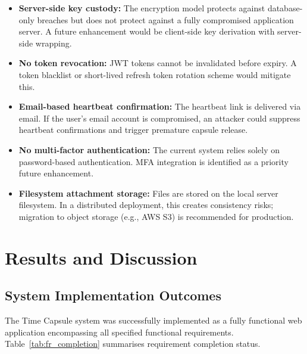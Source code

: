 \documentclass[12pt, a4paper]{article}
\begin{document}
\begin{itemize}
  \item \textbf{Server-side key custody:} The encryption model protects against database-only breaches but does not protect against a fully compromised application server. A future enhancement would be client-side key derivation with server-side wrapping.
  \item \textbf{No token revocation:} JWT tokens cannot be invalidated before expiry. A token blacklist or short-lived refresh token rotation scheme would mitigate this.
  \item \textbf{Email-based heartbeat confirmation:} The heartbeat link is delivered via email. If the user's email account is compromised, an attacker could suppress heartbeat confirmations and trigger premature capsule release.
  \item \textbf{No multi-factor authentication:} The current system relies solely on password-based authentication. MFA integration is identified as a priority future enhancement.
  \item \textbf{Filesystem attachment storage:} Files are stored on the local server filesystem. In a distributed deployment, this creates consistency risks; migration to object storage (e.g., AWS S3) is recommended for production.
\end{itemize}

\section{Results and Discussion}
\label{sec:results}

\subsection{System Implementation Outcomes}

The Time Capsule system was successfully implemented as a fully functional web application encompassing all specified functional requirements. Table~\ref{tab:fr_completion} summarises requirement completion status.
\end{document}
